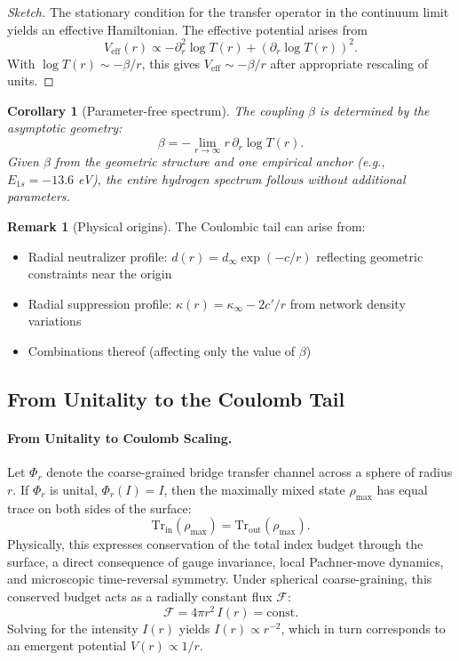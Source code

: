 \documentclass[11pt]{article}
\theoremstyle{plain}
\newtheorem{corollary}[theorem]{Corollary}
\theoremstyle{definition}
\newtheorem{remark}[theorem]{Remark}
\begin{document}
\begin{proof}[Sketch]
  The stationary condition for the transfer operator in the continuum limit yields an
  effective Hamiltonian. The effective potential arises from
  \[
    V_{\text{eff}}(r) \propto -\partial_r^2 \log T(r) + (\partial_r \log T(r))^2.
  \]
  With $\log T(r) \sim -\beta/r$, this gives $V_{\text{eff}} \sim -\beta/r$ after
  appropriate rescaling of units.
\end{proof}

\begin{corollary}[Parameter-free spectrum]
  The coupling $\beta$ is determined by the asymptotic geometry:
  \[
    \beta = -\lim_{r\to\infty} r\,\partial_r \log T(r).
  \]
  Given $\beta$ from the geometric structure and one empirical anchor (e.g., $E_{1s} = -13.6$ eV),
  the entire hydrogen spectrum follows without additional parameters.
\end{corollary}

\begin{remark}[Physical origins]
  The Coulombic tail can arise from:
  \begin{itemize}
    \item Radial neutralizer profile: $d(r) = d_\infty \exp(-c/r)$ reflecting geometric
      constraints near the origin
    \item Radial suppression profile: $\kappa(r) = \kappa_\infty - 2c'/r$ from network
      density variations
    \item Combinations thereof (affecting only the value of $\beta$)
  \end{itemize}
\end{remark}

\subsection{From Unitality to the Coulomb Tail}
\label{subsec:unitality-coulomb}

\paragraph{From Unitality to Coulomb Scaling.}
Let $\Phi_r$ denote the coarse-grained bridge transfer channel across a sphere of radius $r$.
If $\Phi_r$ is unital, $\Phi_r(I) = I$, then the maximally mixed state $\rho_{\text{max}}$ has equal trace on both sides of the surface:
\[
  \mathrm{Tr}_{\text{in}}(\rho_{\text{max}}) = \mathrm{Tr}_{\text{out}}(\rho_{\text{max}}).
\]
Physically, this expresses conservation of the total index budget through the surface, a direct consequence of gauge invariance, local Pachner-move dynamics, and microscopic time-reversal symmetry.
Under spherical coarse-graining, this conserved budget acts as a radially constant flux $\mathcal{F}$:
\[
  \mathcal{F} = 4\pi r^2 \, I(r) = \text{const}.
\]
Solving for the intensity $I(r)$ yields $I(r) \propto r^{-2}$, which in turn corresponds to an emergent potential $V(r) \propto 1/r$.
\end{document}
